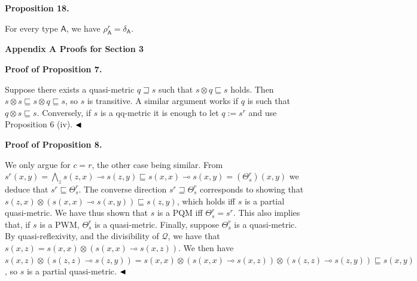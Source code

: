  
\par\medskip\noindent\textbf{Proposition 18.}\par
 
 
For every type $\mathsf{A}$, we have $\rho_{\mathsf{A}}^{r}=\delta_{\mathsf{A}}$.\par
 
 
 


 
\par\medskip\noindent\textbf{Appendix A Proofs for Section 3}\par
 
 
\par\medskip\noindent\textbf{Proof of Proposition 7.}\par
 
 
Suppose there exists a quasi-metric $q\sqsupseteq s$ such that $s\otimes q\sqsubseteq s$ holds. Then $s\otimes s\sqsubseteq s\otimes q\sqsubseteq s$, so $s$ is transitive. A similar argument works if $q$ is such that $q\otimes s\sqsubseteq s$. Conversely, if $s$ is a qq-metric it is enough to let $q:=s^{r}$ and use Proposition 6 (iv). $\hfill\blacktriangleleft$\par
 
 
 
 
\par\medskip\noindent\textbf{Proof of Proposition 8.}\par
 
 
We only argue for $c=r$, the other case being similar. From $s^{r}(x,y)=\bigwedge_{z}s(z,x)\multimap s(z,y)\sqsubseteq s(x,x)\multimap s(x,%
y)=(\Theta^{r}_{s})(x,y)$ we deduce that $s^{r}\sqsubseteq\Theta^{r}_{s}$. The converse direction $s^{r}\sqsupseteq\Theta^{r}_{s}$ corresponds to showing that $s(z,x)\otimes(s(x,x)\multimap s(x,y))\sqsubseteq s(z,y)$, which holds iff $s$ is a partial quasi-metric. We have thus shown that $s$ is a PQM iff $\Theta^{r}_{s}=s^{r}$. This also implies that, if $s$ is a PWM, $\Theta^{r}_{s}$ is a quasi-metric. Finally, suppose $\Theta^{r}_{s}$ is a quasi-metric. By quasi-reflexivity, and the divisibility of $\mathcal{Q}$, we have that $s(x,z)=s(x,x)\otimes(s(x,x)\multimap s(x,z))$. We then have $s(x,z)\otimes(s(z,z)\multimap s(z,y))=s(x,x)\otimes(s(x,x)\multimap s(x,z))%
\otimes(s(z,z)\multimap s(z,y))\sqsubseteq s(x,y)$, so $s$ is a partial quasi-metric. $\hfill\blacktriangleleft$\par
 
